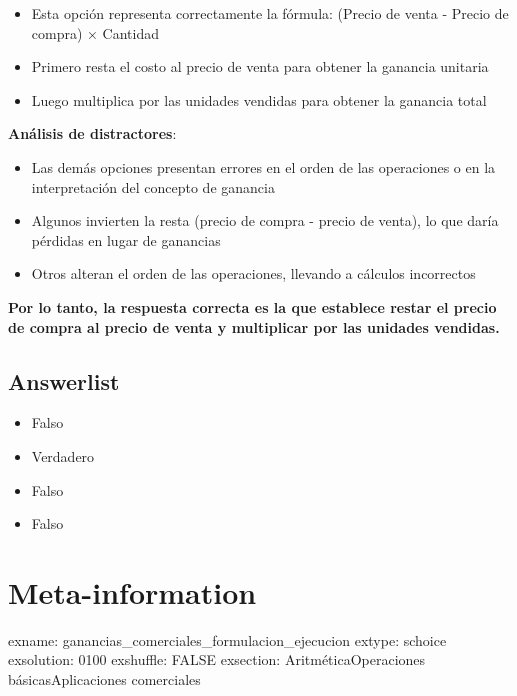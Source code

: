 \documentclass[
]{article}
\providecommand{\tightlist}{%
  \setlength{\itemsep}{0pt}\setlength{\parskip}{0pt}}
\begin{document}
\begin{itemize}
\tightlist
\item
  Esta opción representa correctamente la fórmula: (Precio de venta -
  Precio de compra) × Cantidad
\item
  Primero resta el costo al precio de venta para obtener la ganancia
  unitaria
\item
  Luego multiplica por las unidades vendidas para obtener la ganancia
  total
\end{itemize}

\textbf{Análisis de distractores}:

\begin{itemize}
\tightlist
\item
  Las demás opciones presentan errores en el orden de las operaciones o
  en la interpretación del concepto de ganancia
\item
  Algunos invierten la resta (precio de compra - precio de venta), lo
  que daría pérdidas en lugar de ganancias
\item
  Otros alteran el orden de las operaciones, llevando a cálculos
  incorrectos
\end{itemize}

\textbf{Por lo tanto, la respuesta correcta es la que establece restar
el precio de compra al precio de venta y multiplicar por las unidades
vendidas.}

\subsection{Answerlist}\label{answerlist-1}

\begin{itemize}
\tightlist
\item
  Falso
\item
  Verdadero
\item
  Falso
\item
  Falso
\end{itemize}

\section{Meta-information}\label{meta-information}

exname: ganancias\_comerciales\_formulacion\_ejecucion extype: schoice
exsolution: 0100 exshuffle: FALSE exsection:
Aritmética\textbar Operaciones básicas\textbar Aplicaciones comerciales
\end{document}
